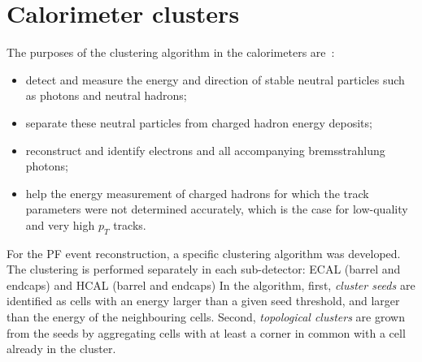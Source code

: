 \section{Calorimeter clusters}
The purposes of the clustering algorithm in the calorimeters are~\cite{Sirunyan:2017ulk}:
\begin{itemize} 
\item detect and measure the energy and direction of stable neutral particles such as photons and neutral hadrons;
\item separate these neutral particles from charged hadron energy deposits;
\item reconstruct and identify electrons and all accompanying bremsstrahlung photons;
\item help the energy measurement of charged hadrons for which the track parameters were not determined accurately,
which is the case for low-quality and very high $p_T$ tracks.
\end{itemize}
For the PF event reconstruction, a  specific clustering algorithm was developed. 
The clustering is performed separately in each sub-detector: ECAL (barrel and endcaps) and HCAL (barrel and endcaps)
In the algorithm, first, \textit{cluster seeds} are identified   as cells with an energy larger than a given seed threshold, and
larger than the energy of the neighbouring cells. Second, \textit{topological clusters} are grown from the seeds by aggregating cells with at least a corner in common with a cell already in the cluster.

